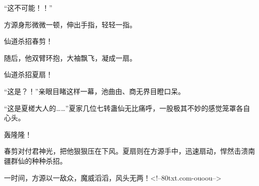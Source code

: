 \begin{this_body}
“这不可能！！”

方源身形微微一顿，伸出手指，轻轻一指。

仙道杀招春剪！

随后，他双臂环抱，大袖飘飞，凝成一扇。

仙道杀招夏扇！

“这是？！”亲眼目睹这样一幕，池曲由、商无界目瞪口呆。

“这是夏槎大人的……”夏家几位七转蛊仙无比痛呼，一股极其不妙的感觉笼罩各自心头。

轰隆隆！

春剪对付君神光，把他狠狠压在下风。夏扇则在方源手中，迅速扇动，悍然击溃南疆群仙的种种杀招。

一时间，方源以一敌众，魔威滔滔，风头无两！<!--80txt.com-ouoou-->

\end{this_body}

